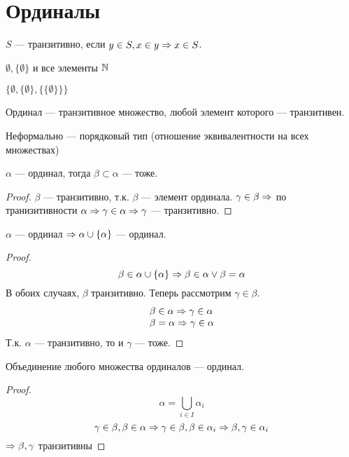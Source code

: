 \section{Ординалы}
\begin{definition}
    \(S\) --- транзитивно, если \(y \in S, x \in y \Rightarrow x \in S\).
\end{definition}
\begin{example}
    \(\emptyset, \{\emptyset\}\) и все элементы \(\mathbb{N}\)
\end{example}
\begin{example}
    \(\{\emptyset, \{\emptyset\}, \{\{\emptyset\}\}\}\)
\end{example}
\begin{definition}
    Ординал --- транзитивное множество, любой элемент которого --- транзитивен.
\end{definition}

Неформально --- порядковый тип (отношение эквивалентности на всех множествах)

\begin{proposition}
    \(\alpha\) --- ординал, тогда \(\beta \subset \alpha\) --- тоже.
\end{proposition}
\begin{proof}
    \(\beta\) --- транзитивно, т.к. \(\beta\) --- элемент ординала. \(\gamma \in \beta \Rightarrow\) по транизитивности \(\alpha \Rightarrow \gamma \in \alpha \Rightarrow \gamma\) --- транзитивно.
\end{proof}

\begin{proposition}
    \(\alpha\) --- ординал \(\Rightarrow \alpha \cup \{\alpha\}\) --- ординал.
\end{proposition}
\begin{proof}
    \[\beta \in \alpha \cup \{\alpha\} \Rightarrow \beta \in \alpha \vee \beta = \alpha\] 
    В обоих случаях, \(\beta\) транзитивно.
    Теперь рассмотрим \(\gamma \in \beta\). 
    \[\begin{array}{l}
        \beta \in \alpha \Rightarrow \gamma \in \alpha \\
        \beta = \alpha \Rightarrow \gamma \in \alpha
    \end{array}\]
    Т.к. \(\alpha\) --- транзитивно, то и \(\gamma\) --- тоже.
\end{proof}
\begin{proposition}
    Объединение любого множества ординалов --- ординал.
\end{proposition}
\begin{proof}
    \[\alpha = \bigcup_{i \in I}\alpha_i\]
    \[\gamma \in \beta, \beta \in \alpha \Rightarrow \gamma \in \beta, \beta \in \alpha_i \Rightarrow \beta, \gamma \in \alpha_i\]
    \(\Rightarrow \beta, \gamma\) транзитивны
\end{proof}

